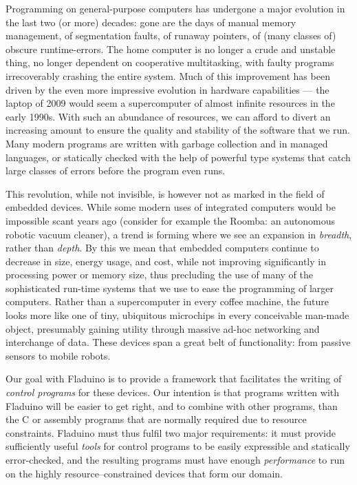 \documentclass[a4paper, oneside, final]{memoir}
\begin{document}
Programming on general-purpose computers has undergone a major
evolution in the last two (or more) decades: gone are the days of
manual memory management, of segmentation faults, of runaway pointers,
of (many classes of) obscure runtime-errors.  The home computer is no
longer a crude and unstable thing, no longer dependent on cooperative
multitasking, with faulty programs irrecoverably crashing the entire
system.  Much of this improvement has been driven by the even more
impressive evolution in hardware capabilities --- the laptop of 2009
would seem a supercomputer of almost infinite resources in the early
1990s.  With such an abundance of resources, we can afford to divert
an increasing amount to ensure the quality and stability of the
software that we run.  Many modern programs are written with garbage
collection and in managed languages, or statically checked with the
help of powerful type systems that catch large classes of errors
before the program even runs.

This revolution, while not invisible, is however not as marked in the
field of embedded devices.  While some modern uses of integrated
computers would be impossible scant years ago (consider for example
the Roomba: an autonomous robotic vacuum cleaner), a trend is forming
where we see an expansion in \textit{breadth}, rather than
\textit{depth}.  By this we mean that embedded computers continue to
decrease in size, energy usage, and cost, while not improving
significantly in processing power or memory size, thus precluding the
use of many of the sophisticated run-time systems that we use to ease
the programming of larger computers.  Rather than a supercomputer in
every coffee machine, the future looks more like one of tiny,
ubiquitous microchips in every conceivable man-made object, presumably
gaining utility through massive ad-hoc networking and interchange of
data.  These devices span a great belt of functionality: from passive
sensors to mobile robots.

Our goal with Fladuino is to provide a framework that facilitates the
writing of \textit{control programs} for these devices.  Our intention
is that programs written with Fladuino will be easier to get right,
and to combine with other programs, than the C or assembly programs
that are normally required due to resource constraints.  Fladuino must
thus fulfil two major requirements: it must provide sufficiently
useful \textit{tools} for control programs to be easily expressible
and statically error-checked, and the resulting programs must have
enough \textit{performance} to run on the highly resource--constrained
devices that form our domain.
\end{document}
